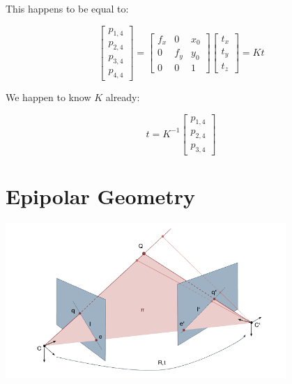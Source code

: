 \documentclass{article}
\begin{document}
This happens to be equal to:

\begin{equation*}
    \begin{bmatrix}
        p_{1, 4} \\
        p_{2, 4} \\
        p_{3, 4} \\
        p_{4, 4}
    \end{bmatrix}
    =
    \begin{bmatrix}
        f_x & 0 & x_0 \\
        0 & f_y & y_0 \\
        0 & 0 & 1
    \end{bmatrix}
    \begin{bmatrix}
        t_x \\ 
        t_y \\
        t_z
    \end{bmatrix}
    = Kt
\end{equation*}

We happen to know $K$ already:

\begin{equation*}
    t = K^{-1}
    \begin{bmatrix}
        p_{1, 4} \\
        p_{2, 4} \\
        p_{3, 4}
    \end{bmatrix}
\end{equation*}

\newpage

\section*{Epipolar Geometry}

\begin{center}
\includegraphics[width=0.8\textwidth]{images/epipolar_geometry.png}
\end{center}
\end{document}
